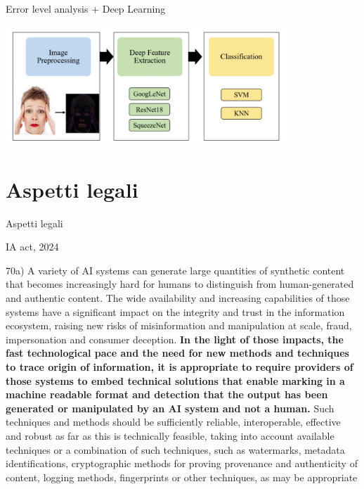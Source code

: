 \documentclass[11pt]{beamer}
\begin{document}
\begin{frame}{Error level analysis + Deep Learning \cite{rafique2023deep}}
\begin{center}
\includegraphics[width=0.8\textwidth]{Pic/ELA+DEEP.png}
\end{center}
\end{frame}



\section{Aspetti legali}

\begin{frame}
\begin{center}
\Huge
Aspetti legali
\end{center}
\end{frame}



\begin{frame}{IA act, 2024}
\begin{center}
\small
70a) A variety of AI systems can generate large quantities of synthetic content that becomes increasingly hard for humans to distinguish from human-generated and authentic content. The wide availability and increasing capabilities of those systems have a significant impact on the integrity and trust in the information ecosystem, raising new risks of misinformation and manipulation at scale, fraud, impersonation and consumer deception. \textbf{In the light of those impacts, the fast technological pace and the need for new methods and techniques to trace origin of information, it is appropriate to require providers of those systems to embed technical solutions that enable marking in a machine readable format and detection that the output has been generated or manipulated by an AI system and not a human.} Such techniques and methods should be sufficiently reliable, interoperable, effective and robust as far as this is technically feasible, taking into account available techniques or a combination of such techniques, such as watermarks, metadata identifications, cryptographic methods for proving provenance and authenticity of content, logging methods, fingerprints or other techniques, as may be appropriate
\end{center}
\end{frame}
\end{document}
